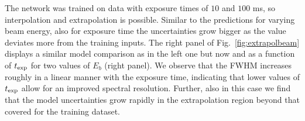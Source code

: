 The network was trained on data with exposure times of $10$ and $100$ ms,
so interpolation and extrapolation is possible. Similar to the predictions for varying beam energy, also for exposure time the uncertainties grow bigger as the value deviates more from the training inputs.
%
The right panel of Fig.~\ref{fig:extrapolbeam} displays a similar model
comparison as in the left one but now and as a function of $t_{\rm exp}$ for two values of $E_b$ (right panel).
%
We observe that the FWHM increases roughly in a linear manner with the exposure time, indicating
that lower values of $t_{\rm exp}$ allow for an improved spectral resolution.
%
Further, also in this case we find that the model uncertainties grow rapidly in the
extrapolation region beyond that covered for the training dataset.


